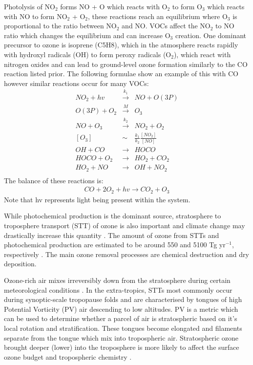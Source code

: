 Photolysis of NO$_2$ forms NO + O which reacts with O$_2$ to form O$_3$ which reacts with NO to form NO$_2$ + O$_2$, these reactions reach an equilibrium where O$_3$ is proportional to the ratio between NO$_2$ and NO.
VOCs affect the NO$_2$ to NO ratio which changes the equilibrium and can increase O$_3$ creation. 
One dominant precursor to ozone is isoprene (C5H8), which in the atmosphere reacts rapidly with hydroxyl radicals (OH) to form peroxy radicals (O$_2$), which react with nitrogen oxides and can lead to ground-level ozone formation similarly to the CO reaction listed prior.
The following formulae show an example of this with CO however similar reactions occur for many VOCs:
\begin{eqnarray*}
NO_2 + hv &\overset{k_1}{\rightarrow}& NO + O(3P) \\
O(3P) + O_2 &\overset{M}{\rightarrow}& O_3 \\
NO + O_3 &\overset{k_2}{\rightarrow}& NO_2 + O_2 \\
\left[O_3\right] &\sim& \frac{k_1}{k_2} \frac{\left[NO_2\right]}{\left[NO\right]} \\
OH + CO &{\rightarrow}& HOCO \\
HOCO + O_2 &{\rightarrow}& HO_2 + CO_2 \\
HO_2 + NO &{\rightarrow}& OH + NO_2 \\
\end{eqnarray*}
The balance of these reactions is:
\begin{eqnarray*} CO + 2O_2 + hv {\rightarrow} CO_2 + O_3 \end{eqnarray*}
Note that hv represents light being present within the system.

While photochemical production is the dominant source, stratosphere to troposphere transport (STT) of ozone is also important and climate change may drastically increase this quantity \cite{Hegglin_2009}.
The amount of ozone from STTs and photochemical production are estimated to be around 550 and 5100 Tg yr$^{-1}$, respectively \cite{Stevenson_2006}. 
The main ozone removal processes are chemical destruction and dry deposition.

Ozone-rich air mixes irreversibly down from the stratosphere during certain meteorological conditions \citep{Sprenger2003,Mihalikova2012}.
In the extra-tropics, STTs most commonly occur during synoptic-scale tropopause folds \citep{Sprenger2003} and are characterised by tongues of high Potential Vorticity (PV) air descending to low altitudes.
PV is a metric which can be used to determine whether a parcel of air is stratospheric based on it's local rotation and stratification.
These tongues become elongated and filaments separate from the tongue which mix into tropospheric air.
Stratospheric ozone brought deeper (lower) into the troposphere is more likely to affect the surface ozone budget and tropospheric chemistry \citep{Zanis2003,Langford_2009}.

  